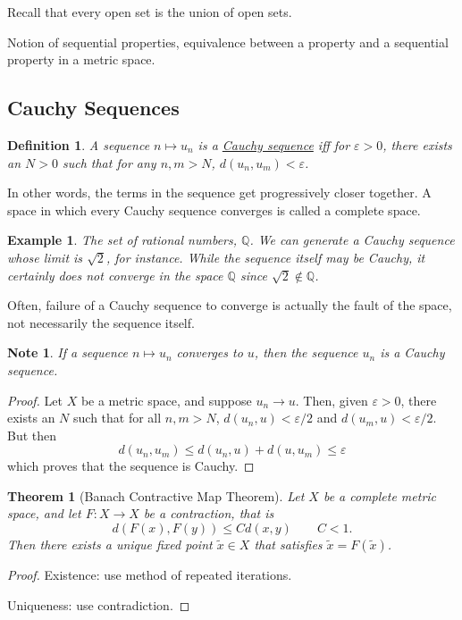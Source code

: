 \documentclass[letterpaper,twoside,11pt]{article}
\theoremstyle{mystyle}
\newtheorem*{thm}{Theorem}		%
\newtheorem{definition}{Definition}[section]
\newtheorem*{ex}{Example}
\newtheorem*{note}{Note}
\newcommand{\Q}{{\mathbb Q}}
\begin{document}
Recall that every open set is the union of open sets. 

Notion of sequential properties, equivalence between a property and a sequential property in a metric space. 

\subsection*{Cauchy Sequences}
\begin{definition}
A sequence $n\mapsto u_n$ is a \underline{Cauchy sequence} iff for $\varepsilon >0$, there exists an $N>0$ such that for any $n, m>N$, $d(u_n, u_m) < \varepsilon$. 
\end{definition}
In other words, the terms in the sequence get progressively closer together. A space in which every Cauchy sequence converges is called a complete space. 
\begin{ex}
The set of rational numbers, $\Q$. We can generate a Cauchy sequence whose limit is $\sqrt{2}$, for instance. While the sequence itself may be Cauchy, it certainly does not converge in the space $\Q$ since $\sqrt{2} \notin \Q$. 
\end{ex}
Often, failure of a Cauchy sequence to converge is actually the fault of the space, not necessarily the sequence itself. 
\begin{note}
If a sequence $n\mapsto u_n$ converges to $u$, then the sequence $u_n$ is a Cauchy sequence. 
\end{note}
\begin{proof}
Let $X$ be a metric space, and suppose $u_n \to u$. Then, given $\varepsilon > 0$, there exists an $N$ such that for all $n,m>N$, $d(u_n, u) < \varepsilon/2$ and $ d(u_m, u) < \varepsilon/2$. But then 
\[d\left( {{u_n},{u_m}} \right) \leq d\left( {{u_n},u} \right) + d\left( {u,{u_m}} \right) \leq \varepsilon \]
which proves that the sequence is Cauchy. 
\end{proof}

\begin{thm}[Banach Contractive Map Theorem]
Let $X$ be a complete metric space, and let $F:X\to X$ be a contraction, that is 
\[d\left( {F\left( x \right),F\left( y \right)} \right) \leq Cd\left( {x,y} \right)\qquad C < 1.\]
Then there exists a unique fixed point $\tilde x\in X$ that satisfies $\tilde x = F\left(\tilde x\right)$. 
\end{thm}
\begin{proof}
Existence: use method of repeated iterations. 

Uniqueness: use contradiction. 
\end{proof}
\end{document}
